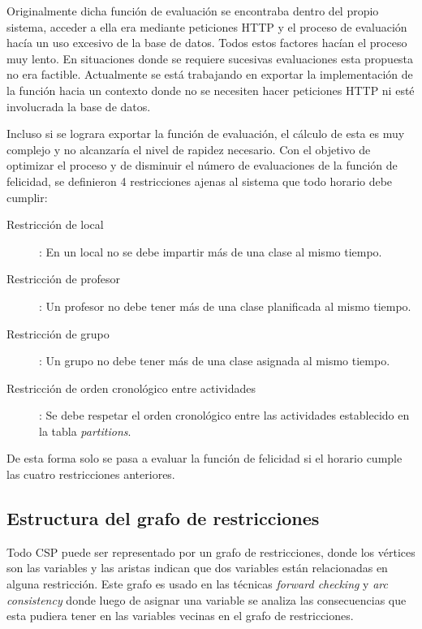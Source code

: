 Originalmente dicha funci\'on de evaluaci\'on se encontraba dentro del propio sistema, acceder a ella era mediante peticiones HTTP y el proceso de evaluaci\'on hac\'ia un uso excesivo de la base de datos. Todos estos factores hac\'ian el proceso muy lento. En situaciones donde se requiere sucesivas evaluaciones esta propuesta no era factible. Actualmente se est\'a trabajando en exportar la implementaci\'on de la funci\'on hacia un contexto donde no se necesiten hacer peticiones HTTP ni est\'e involucrada la base de datos.

Incluso si se lograra exportar la funci\'on de evaluaci\'on, el c\'alculo de esta es muy complejo y no alcanzar\'ia el nivel de rapidez necesario. Con el objetivo de optimizar el proceso y de disminuir el n\'umero de evaluaciones de la funci\'on de felicidad, se definieron 4 restricciones ajenas al sistema que todo horario debe cumplir:

\begin{description}

\item[Restricci\'on de local]: En un local no se debe impartir m\'as de una clase al mismo tiempo.
\item[Restricci\'on de profesor]: Un profesor no debe tener m\'as de una clase planificada al mismo tiempo.
\item[Restricci\'on de grupo]: Un grupo no debe tener m\'as de una clase asignada al mismo tiempo.
\item[Restricci\'on de orden cronol\'ogico entre actividades]: Se debe respetar el orden cronol\'ogico entre las actividades establecido en la tabla \emph{partitions}.

\end{description}

De esta forma solo se pasa a evaluar la funci\'on de felicidad si el horario cumple las cuatro restricciones anteriores.

\subsection{Estructura del grafo de restricciones}

Todo CSP puede ser representado por un grafo de restricciones, donde los v\'ertices son las variables y las aristas indican que dos variables est\'an relacionadas en alguna restricci\'on. Este grafo es usado en las t\'ecnicas \emph{forward checking} y \emph{arc consistency} donde luego de asignar una variable se analiza las consecuencias que esta pudiera tener en las variables vecinas en el grafo de restricciones.


